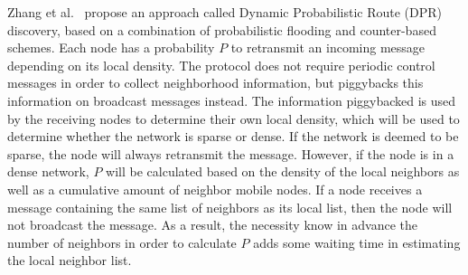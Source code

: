 Zhang et al.~\cite{Zhang2005} propose an approach called Dynamic Probabilistic Route (DPR) discovery, based on a combination of probabilistic flooding and counter-based schemes. 
Each node has a probability $P$ to retransmit an incoming message depending on its local density. 
The protocol does not require periodic control messages in order to collect neighborhood information, but piggybacks this information on broadcast messages instead.
The information piggybacked is used by the receiving nodes to determine their own local density, which will be used to determine whether the network is sparse or dense. 
If the network is deemed to be sparse, the node will always retransmit the message. 
However, if the node is in a dense network, $P$ will be calculated based on the density of the local neighbors as well as a cumulative amount of neighbor mobile nodes. 
If a node receives a message containing the same list of neighbors as its local list, then the node will not broadcast the message. 
As a result, the necessity know in advance the number of neighbors in order to calculate $P$ adds some waiting time in estimating the local neighbor list. 


